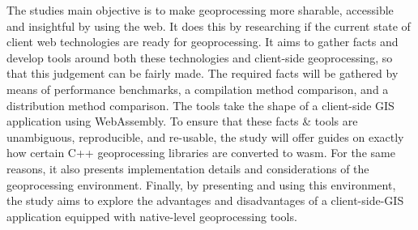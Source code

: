 





The studies main objective is to make geoprocessing more sharable, accessible and insightful by using the web. It does this by researching if the current state of client web technologies are ready for geoprocessing.
It aims to gather facts and develop tools around both these technologies and client-side geoprocessing, so that this judgement can be fairly made. 
The required facts will be gathered by means of performance benchmarks, a compilation method comparison, and a distribution method comparison.  
The tools take the shape of a client-side GIS application using WebAssembly.
To ensure that these facts \& tools are unambiguous, reproducible, and re-usable, the study will offer guides on exactly how certain C++ geoprocessing libraries are converted to wasm. For the same reasons, it also presents implementation details and considerations of the geoprocessing environment.  
Finally, by presenting and using this environment, the study aims to explore the advantages and disadvantages of a client-side-GIS application equipped with native-level geoprocessing tools. 


